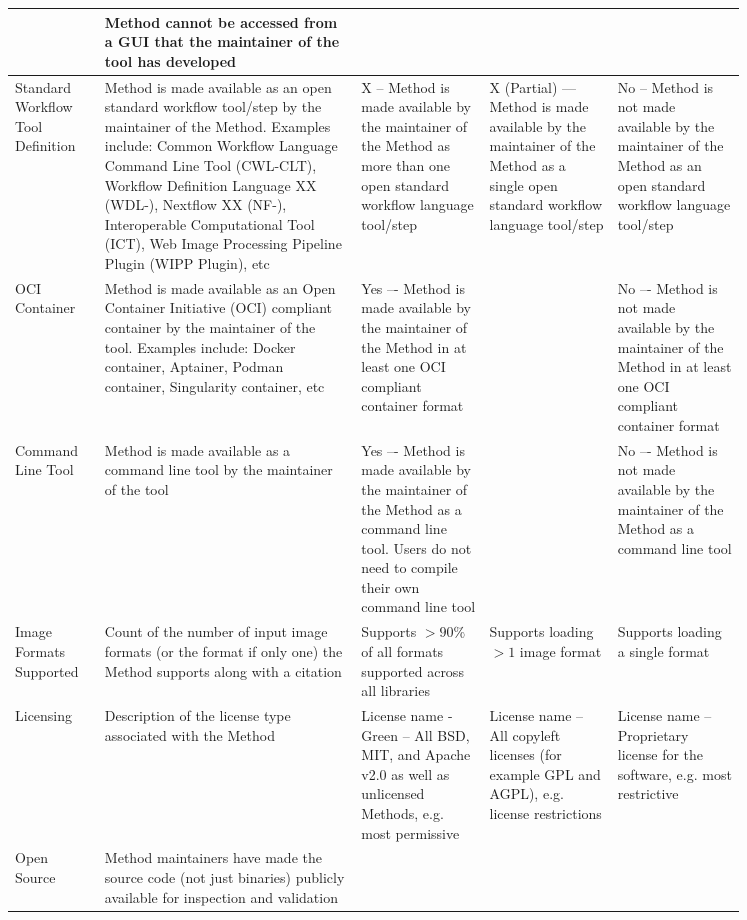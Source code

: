 \documentclass[sn-mathphys,Numbered]{sn-jnl}%
\theoremstyle{thmstyleone}%
\theoremstyle{thmstyletwo}%
\theoremstyle{thmstylethree}%
\begin{document}
\begin{table}
\begin{tiny}
\begin{tabular} {p{0.1\linewidth} | p{0.3\linewidth} | p{0.15\linewidth} | p{0.15\linewidth} | p{0.15\linewidth}}
 & Method cannot be accessed from a GUI that the maintainer of the tool has developed
 \\
 \hline
Standard Workflow Tool Definition
 & Method is made available as an open standard workflow tool/step by the maintainer of the Method. Examples include: Common Workflow Language Command Line Tool (CWL-CLT), Workflow Definition Language XX (WDL-), Nextflow XX (NF-), Interoperable Computational Tool (ICT), Web Image Processing Pipeline Plugin (WIPP Plugin), etc
 & X -- Method is made available by the maintainer of the Method as more than one open standard workflow language tool/step
 & X (Partial) –– Method is made available by the maintainer of the Method as a single open standard workflow language tool/step
 & No -- Method is not made available by the maintainer of the Method as an open standard workflow language tool/step
 \\
 \hline
OCI Container
 & Method is made available as an Open Container Initiative (OCI) compliant container by the maintainer of the tool. Examples include: Docker container, Aptainer, Podman container, Singularity container, etc
 & Yes –- Method is made available by the maintainer of the Method in at least one OCI compliant container format
 &
 & No –- Method is not made available by the maintainer of the Method in at least one OCI compliant container format
 \\
 \hline
Command Line Tool
 & Method is made available as a command line tool by the maintainer of the tool
 & Yes –- Method is made available by the maintainer of the Method as a command line tool. Users do not need to compile their own command line tool
 &
 & No –- Method is not made available by the maintainer of the Method as a command line tool
 \\
 \hline
Image Formats Supported
 & Count of the number of input image formats (or the format if only one) the Method supports along with a citation
 & Supports $> 90\%$ of all formats supported across all libraries
 & Supports loading $>1$ image format
 & Supports loading a single format
 \\
 \hline
Licensing
 & Description of the license type associated with the Method
 & License name - Green – All BSD, MIT, and Apache v2.0 as well as unlicensed Methods, e.g. most permissive
 & License name -- All copyleft licenses (for example GPL and AGPL), e.g. license restrictions
 & License name -- Proprietary license for the software, e.g. most restrictive
 \\
 \hline
Open Source
 & Method maintainers have made the source code (not just binaries) publicly available for inspection and validation

\end{tabular}
\end{tiny}
\end{table}
\end{document}
